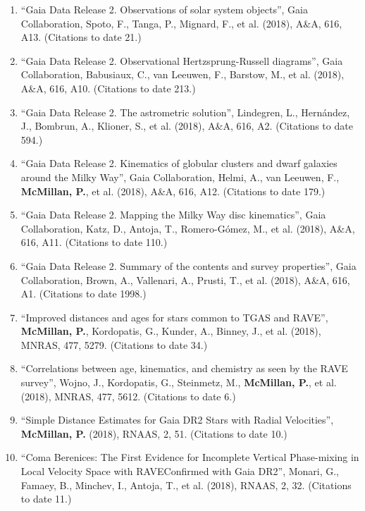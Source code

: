 \documentclass{resume}
\begin{document}
\begin{enumerate}
\item ``Gaia Data Release 2. Observations of solar system objects'', Gaia Collaboration, Spoto, F., Tanga, P., Mignard, F., et al. (2018), A\&A, 616, A13. (Citations to date 21.)

\item ``Gaia Data Release 2. Observational Hertzsprung-Russell diagrams'', Gaia Collaboration, Babusiaux, C., van Leeuwen, F., Barstow, M., et al. (2018), A\&A, 616, A10. (Citations to date 213.)

\item ``Gaia Data Release 2. The astrometric solution'', Lindegren, L., Hern\'andez, J., Bombrun, A., Klioner, S., et al. (2018), A\&A, 616, A2. (Citations to date 594.)

\item ``Gaia Data Release 2. Kinematics of globular clusters and dwarf galaxies around the Milky Way'', Gaia Collaboration, Helmi, A., van Leeuwen, F., \textbf{McMillan, P.}, et al. (2018), A\&A, 616, A12. (Citations to date 179.)

\item ``Gaia Data Release 2. Mapping the Milky Way disc kinematics'', Gaia Collaboration, Katz, D., Antoja, T., Romero-G\'omez, M., et al. (2018), A\&A, 616, A11. (Citations to date 110.)

\item ``Gaia Data Release 2. Summary of the contents and survey properties'', Gaia Collaboration, Brown, A., Vallenari, A., Prusti, T., et al. (2018), A\&A, 616, A1. (Citations to date 1998.)

\item ``Improved distances and ages for stars common to TGAS and RAVE'', \textbf{McMillan, P.}, Kordopatis, G., Kunder, A., Binney, J., et al. (2018), MNRAS, 477, 5279. (Citations to date 34.)

\item ``Correlations between age, kinematics, and chemistry as seen by the RAVE survey'', Wojno, J., Kordopatis, G., Steinmetz, M., \textbf{McMillan, P.}, et al. (2018), MNRAS, 477, 5612. (Citations to date 6.)

\item ``Simple Distance Estimates for Gaia DR2 Stars with Radial Velocities'', \textbf{McMillan, P.} (2018), RNAAS, 2, 51. (Citations to date 10.)

\item ``Coma Berenices: The First Evidence for Incomplete Vertical Phase-mixing in Local Velocity Space with RAVE{\textemdash}Confirmed with Gaia DR2'', Monari, G., Famaey, B., Minchev, I., Antoja, T., et al. (2018), RNAAS, 2, 32. (Citations to date 11.)


\end{enumerate}
\end{document}
